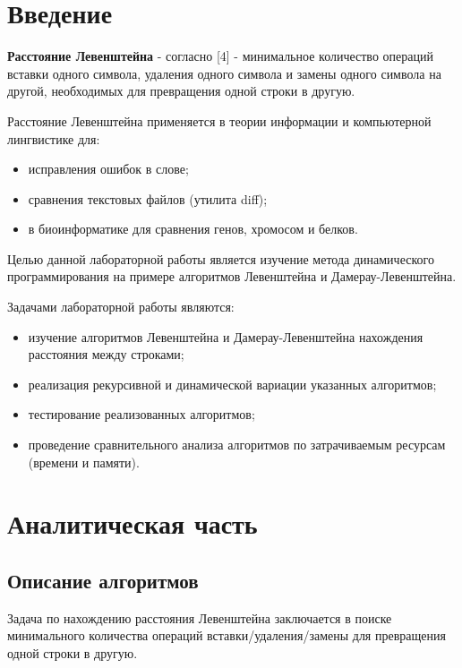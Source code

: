 \documentclass[12pt, a4paper]{report}
\begin{document}


\tableofcontents

\newpage
\chapter*{Введение}
\textbf{Расстояние Левенштейна} - согласно [4] - минимальное количество операций вставки одного символа, удаления одного символа и замены одного символа на другой, необходимых для превращения одной строки в другую.

Расстояние Левенштейна применяется в теории информации и компьютерной лингвистике для:

\begin{itemize}
	\item исправления ошибок в слове;
	\item сравнения текстовых файлов (утилита diff);
	\item в биоинформатике для сравнения генов, хромосом и белков.
\end{itemize}

Целью данной лабораторной работы является изучение метода динамического программирования на примере алгоритмов
Левенштейна и Дамерау-Левенштейна. 

Задачами лабораторной работы являются:
\begin{itemize}
  	\item изучение алгоритмов Левенштейна и Дамерау-Левенштейна нахождения расстояния между строками;
	\item реализация рекурсивной и динамической вариации указанных алгоритмов; 
	\item тестирование реализованных алгоритмов; 
	\item проведение сравнительного анализа алгоритмов по затрачиваемым ресурсам (времени и памяти).
\end{itemize}


\chapter{Аналитическая часть}
		\section{Описание алгоритмов}
Задача по нахождению расстояния Левенштейна заключается в поиске минимального количества операций вставки/удаления/замены для превращения одной строки в другую.
\end{document}
